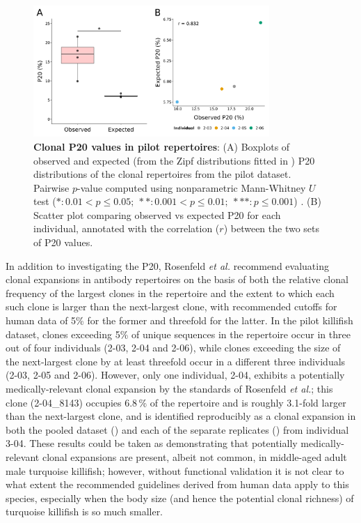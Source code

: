 \begin{figure}
\centering
\includegraphics[width=0.8\textwidth]{_Figures/png/pilot-clones-zipf-p20-obs-exp}
\caption[Clonal P20 values in \Nfu pilot repertoires]{\textbf{Clonal P20 values in \Nfu pilot repertoires}: (A) Boxplots of observed and expected (from the Zipf distributions fitted in ) P20 distributions of the clonal repertoires from the pilot \igseq dataset. Pairwise $p$-value computed using nonparametric Mann-Whitney $U$ test ($*: 0.01 < p \leq 0.05;~**: 0.001 < p \leq 0.01;~***: p \leq 0.001$) . (B) Scatter plot comparing observed vs expected P20 for each individual, annotated with the correlation ($r$) between the two sets of P20 values.}
\label{fig:igseq-pilot-clones-zipf-p20}
\end{figure}

In addition to investigating the P20, Rosenfeld \textit{et al.} \parencite{rosenfeld2018clonesize} recommend evaluating clonal expansions in antibody repertoires on the basis of both the relative clonal frequency of the largest clones in the repertoire and the extent to which each such clone is larger than the next-largest clone, with recommended cutoffs for human data of 5\% for the former and threefold for the latter. In the pilot killifish dataset, clones exceeding 5\% of unique sequences in the repertoire occur in three out of four individuals (2-03, 2-04 and 2-06), while clones exceeding the size of the next-largest clone by at least threefold occur in a different three individuals (2-03, 2-05 and 2-06). However, only one individual, 2-04, exhibits a potentially medically-relevant clonal expansion by the standards of Rosenfeld \textit{et al.}; this clone (2-04\_8143) occupies 6.8\,\% of the repertoire and is roughly 3.1-fold larger than the next-largest clone, and is identified reproducibly as a clonal expansion in both the pooled dataset () and each of the separate replicates () from individual 3-04. These results could be taken as demonstrating that potentially medically-relevant clonal expansions are present, albeit not common, in middle-aged adult male turquoise killifish; however, without functional validation it is not clear to what extent the recommended guidelines derived from human data apply to this species, especially when the body size (and hence the potential clonal richness) of turquoise killifish is so much smaller.

